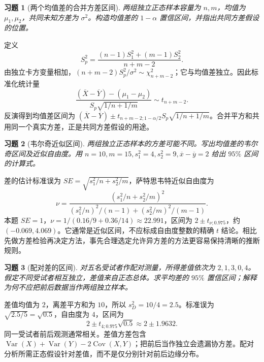 \documentclass[UTF8,12pt,a4paper,fontset=fandol]{ctexart}
\newtheorem{exercise}{习题}[section]
\begin{document}
\begin{exercise}[两个均值差的合并方差区间]\label{q:B13.3}
两组独立正态样本容量为 $n,m$，均值为 $\mu_1,\mu_2$，共同未知方差为 $\sigma^2$。构造均值差的 $1-\alpha$ 置信区间，并指出共同方差假设的位置。\par{}
\end{exercise}

\begin{solve}\label{a:B13.3}定义\[S_p^2=\frac{(n-1)S_1^2+(m-1)S_2^2}{n+m-2}.\]由独立卡方变量相加，$(n+m-2)S_p^2/\sigma^2\sim\chi^2_{n+m-2}$；它与均值差独立。因此标准化统计量\[\frac{(\overline X-\overline Y)-(\mu_1-\mu_2)}{S_p\sqrt{1/n+1/m}}\sim t_{n+m-2}.\]反演得到均值差区间为 $(\overline X-\overline Y)\pm t_{n+m-2;1-\alpha/2}S_p\sqrt{1/n+1/m}$。合并平方和共用同一个真实方差，正是共同方差假设的用途。\end{solve}

\begin{exercise}[韦尔奇近似区间]\label{q:B13.4}
两组独立正态样本的方差可能不同。写出均值差的韦尔奇区间及近似自由度。用 $n=10,m=15,s_1^2=4,s_2^2=9,\overline x-\overline y=2$ 给出 $95\%$ 区间的计算式。\par{}
\end{exercise}

\begin{solve}\label{a:B13.4}差的估计标准误为 $SE=\sqrt{s_1^2/n+s_2^2/m}$，萨特思韦特近似自由度为\[\nu=\frac{(s_1^2/n+s_2^2/m)^2}{(s_1^2/n)^2/(n-1)+(s_2^2/m)^2/(m-1)}.\]本题 $SE=1$，$\nu=1/(0.16/9+0.36/14)\approx22.991$，区间为 $2\pm t_{\nu;0.975}$，约 $(-0.069,4.069)$。它通常是近似区间，不应标成自由度整数的精确 $t$ 结论。相比先做方差检验再决定方法，事先合理选定允许异方差的方法更容易保持清晰的推断规则。\end{solve}

\begin{exercise}[配对差的区间]\label{q:B13.5}
对五名受试者作配对测量，所得差值依次为 $2,1,3,0,4$。假定不同受试者相互独立，差值来自正态总体。求平均差的 $95\%$ 置信区间；解释为何不应把前后数据当作两组独立样本。\par{}
\end{exercise}

\begin{solve}\label{a:B13.5}差值均值为 $2$，离差平方和为 $10$，所以 $s_D^2=10/4=2.5$。标准误为 $\sqrt{2.5/5}=\sqrt{0.5}$，自由度为 $4$，区间为\[2\pm t_{4;0.975}\sqrt{0.5}\approx2\pm1.9632.\]同一受试者前后观测通常相关。差值方差包含 $\operatorname{Var}(X)+\operatorname{Var}(Y)-2\operatorname{Cov}(X,Y)$；把前后当作独立会遗漏协方差。配对分析所需正态假设针对差值，而不是仅分别针对前后边缘分布。\end{solve}
\end{document}
